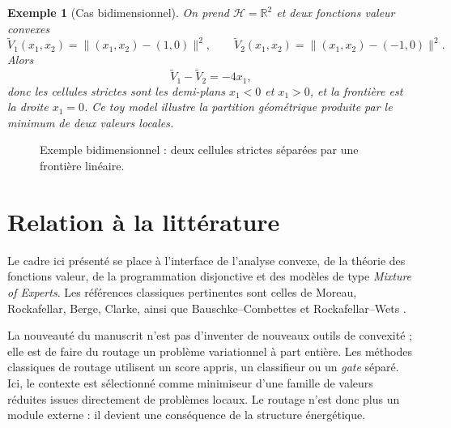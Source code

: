\documentclass[11pt,a4paper]{article}
\newtheorem{example}{Exemple}[section]
\newcommand{\R}{\mathbb R}
\newcommand{\Hh}{\mathcal H}
\newcommand{\Bcal}{\mathcal B}
\begin{document}
\begin{example}[Cas bidimensionnel]
On prend \(\Hh=\R^2\) et deux fonctions valeur convexes
\[
\widetilde V_1(x_1,x_2)=\|(x_1,x_2)-(1,0)\|^2,\qquad
\widetilde V_2(x_1,x_2)=\|(x_1,x_2)-(-1,0)\|^2.
\]
Alors
\[
\widetilde V_1-\widetilde V_2=-4x_1,
\]
donc les cellules strictes sont les demi-plans \(x_1<0\) et \(x_1>0\), et la frontière est la droite \(x_1=0\). Ce toy model illustre la partition géométrique produite par le minimum de deux valeurs locales.
\end{example}

\begin{figure}[ht]
\centering
{}
\caption{Exemple bidimensionnel : deux cellules strictes séparées par une frontière linéaire.}
\end{figure}

\section{Relation à la littérature}

Le cadre ici présenté se place à l'interface de l'analyse convexe, de la théorie des fonctions valeur, de la programmation disjonctive et des modèles de type \emph{Mixture of Experts}. Les références classiques pertinentes sont celles de Moreau, Rockafellar, Berge, Clarke, ainsi que Bauschke--Combettes et Rockafellar--Wets \cite{Moreau1965,Rockafellar1970,Berge1963,Clarke1983,BauschkeCombettes2017,RockafellarWets1998}.

La nouveauté du manuscrit n'est pas d'inventer de nouveaux outils de convexité ; elle est de faire du routage un problème variationnel à part entière. Les méthodes classiques de routage utilisent un score appris, un classifieur ou un \emph{gate} séparé. Ici, le contexte est sélectionné comme minimiseur d'une famille de valeurs réduites issues directement de problèmes locaux. Le routage n'est donc plus un module externe : il devient une conséquence de la structure énergétique.
\end{document}
